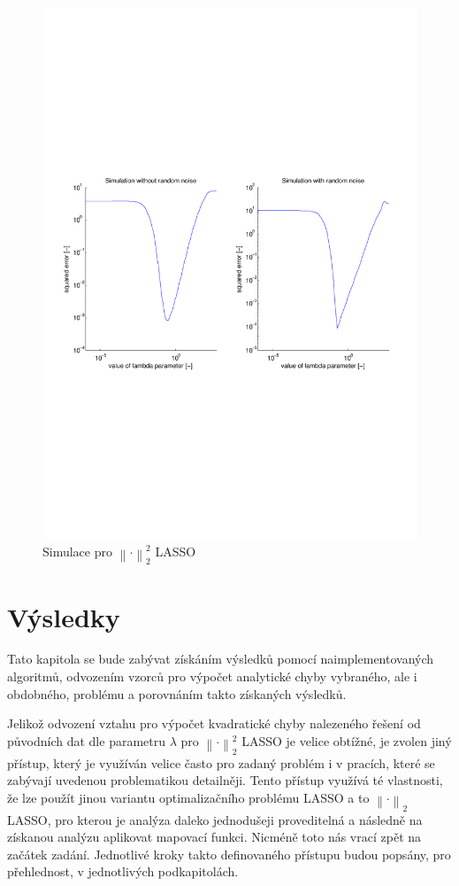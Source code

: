 \documentclass[FM,BP]{tulthesis}
\begin{document}
\begin{figure}[!ht]
	\begin{center}
		\includegraphics[scale=0.7]{obr/l22simulation.pdf}
	\end{center}
	\caption{Simulace pro $\left\| \cdot \right\|_{2}^{2}$ LASSO}
	\label{fig:l22sim}
\end{figure}

\chapter{Výsledky}
\label{ch:vysledky}
Tato kapitola se bude zabývat získáním výsledků pomocí naimplementovaných algoritmů, odvozením vzorců pro výpočet analytické chyby vybraného, ale i obdobného, problému a porovnáním takto získaných výsledků. 

Jelikož odvození vztahu pro výpočet kvadratické chyby nalezeného řešení od původních dat dle parametru $\lambda$ pro $\left\| \cdot \right\|_{2}^{2} $ LASSO je velice obtížné, je zvolen jiný přístup, který je využíván velice často pro zadaný problém i v pracích, které se zabývají uvedenou problematikou detailněji. Tento přístup využívá té vlastnosti, že lze použít jinou variantu optimalizačního problému LASSO a to $\left\| \cdot \right\|_{2}$ LASSO, pro kterou je analýza daleko jednodušeji proveditelná a následně na získanou analýzu aplikovat mapovací funkci. Nicméně toto nás vrací zpět na začátek zadání. Jednotlivé kroky takto definovaného přístupu budou popsány, pro přehlednost, v jednotlivých podkapitolách.
\end{document}
